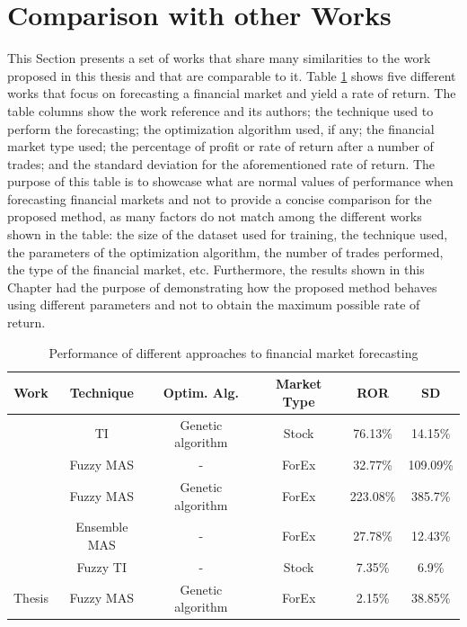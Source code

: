 \section{Comparison with other Works}
\label{section:comparison-with-other-works}

This Section presents a set of works that share many similarities to the work
proposed in this thesis and that are comparable to it. Table \ref{table:results}
shows five different works that focus on forecasting a financial market and
yield a rate of return. The table columns show the work reference and its
authors; the technique used to perform the forecasting; the optimization
algorithm used, if any; the financial market type used; the percentage of profit
or rate of return after a number of trades; and the standard deviation for the
aforementioned rate of return. The purpose of this table is to showcase what are
normal values of performance when forecasting financial markets and not to
provide a concise comparison for the proposed method, as many factors do not
match among the different works shown in the table: the size of the dataset used
for training, the technique used, the parameters of the optimization algorithm,
the number of trades performed, the type of the financial market,
etc. Furthermore, the results shown in this Chapter had the purpose of
demonstrating how the proposed method behaves using different parameters and not
to obtain the maximum possible rate of return.

\begin{table}[ht]
\caption{Performance of different approaches to financial market forecasting}
\label{table:results}
\centering
\begin{tabular}{|c|c|c|c|c|c|}
\hline
Work                                         & Technique                  & Optim. Alg. & Market Type              & ROR & SD \\
\hline
\hline
\cite{Fernandez-Blanco2008} & TI            & Genetic algorithm         & Stock             & 76.13\%     & 14.15\%            \\
\hline
\cite{Korczak2015}          & Fuzzy MAS        & -                      & ForEx & 32.77\%     & 109.09\%           \\
\hline
\cite{Korczak2016}          & Fuzzy MAS        & Genetic algorithm      & ForEx & 223.08\%    & 385.7\%            \\
\hline
\cite{Barbosa2010}          & Ensemble MAS     & -                      & ForEx & 27.78\%     & 12.43\%            \\
\hline
\cite{Escobar2013}          & Fuzzy TI         & -                      & Stock             & 7.35\%      & 6.9\%              \\
\hline
Thesis             & Fuzzy MAS        & Genetic algorithm      & ForEx & 2.15\%      & 38.85\%  \\
\hline
\end{tabular}
\end{table}

